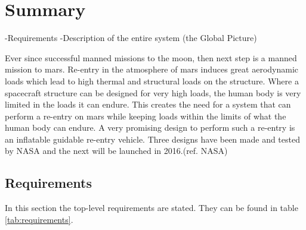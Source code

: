 \section*{Summary}\label{cha:summary}%
-Requirements
-Description of the entire system (the Global Picture)

Ever since successful manned missions to the moon, then next step is a manned mission to mars. Re-entry in the atmosphere of mars induces great aerodynamic loads which lead to high thermal and structural loads on the structure. Where a spacecraft structure can be designed for very high loads, the human body is very limited in the loads it can endure. This creates the need for a system that can perform a re-entry on mars while keeping loads within the limits of what the human body can endure. A very promising design to perform such a re-entry is an inflatable guidable re-entry vehicle. Three designs have been made and tested by NASA and the next will be launched in 2016.(ref. NASA) 

\subsection{Requirements}
In this section the top-level requirements are stated. They can be found in table \ref{tab:requirements}.

